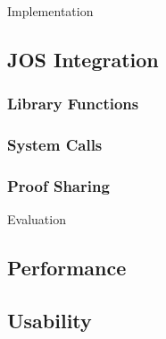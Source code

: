 \documentclass[10pt]{article}
\begin{document}
\begin{section}{Implementation}
\subsection{JOS Integration}
\subsubsection{Library Functions}
\subsubsection{System Calls}
\subsubsection{Proof Sharing}

\end{section}

\begin{section}{Evaluation}
\subsection{Performance}
\subsection{Usability}
\end{section}
\end{document}
